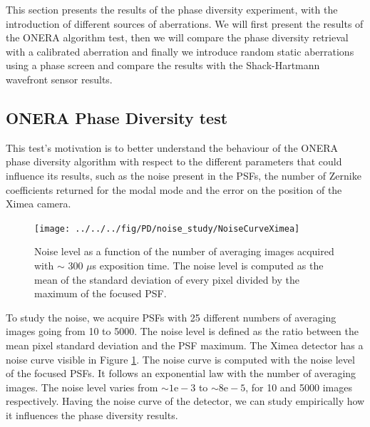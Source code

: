 This section presents the results of the phase diversity experiment, with the introduction of different sources of aberrations. We will first present the results of the ONERA algorithm test, then we will compare the phase diversity retrieval with a calibrated aberration and finally we introduce random static aberrations using a phase screen and compare the results with the Shack-Hartmann wavefront sensor results.

\subsection{ONERA Phase Diversity test}
\label{subsec:ONERAPDtest}

This test's motivation is to better understand the behaviour of the ONERA phase diversity algorithm with respect to the different parameters that could influence its results, such as the noise present in the PSFs, the number of Zernike coefficients returned for the modal mode and the error on the position of the Ximea camera.

\begin{figure}
\begin{center}
\texttt{[image: ../../../fig/PD/noise\_study/NoiseCurveXimea]}
\decoRule
\caption{Noise level as a function of the number of averaging images acquired with $\sim$ 300 $\mu$s exposition time. The noise level is computed as the mean of the standard deviation of every pixel divided by the maximum of the focused PSF.}
\label{fig:NoiseCurve}
\end{center}
\end{figure}

To study the noise, we acquire PSFs with 25 different numbers of averaging images going from 10 to 5000. The noise level is defined as the ratio between the mean pixel standard deviation and the PSF maximum. The Ximea detector has a noise curve visible in Figure \ref{fig:NoiseCurve}. The noise curve is computed with the noise level of the focused PSFs. It follows an exponential law with the number of averaging images. The noise level varies from $\sim 1\mathrm{e}-3$ to $\sim 8\mathrm{e}-5$, for 10 and 5000 images respectively. Having the noise curve of the detector, we can study empirically how it influences the phase diversity results. 

